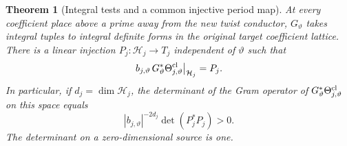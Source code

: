 \documentclass[a4paper,11pt]{article}
\newtheorem{theorem}[proposition]{Theorem}
\theoremstyle{definition}
\theoremstyle{remark}
\numberwithin{equation}{section}
\begin{document}
\begin{theorem}[Integral tests and a common injective period map]
\leavevmode\label{thm:gluedperiodmap844}
At every coefficient place above a prime away from the new twist
conductor, \(G_\vartheta\) takes integral tuples to integral
definite forms in the original target coefficient lattice.
There is a linear injection \(P_j:\mathcal H_j\longrightarrow T_j\)
independent of \(\vartheta\) such that
\[
        b_{j,\vartheta}\,G_\vartheta^*\Theta_{j,\vartheta}^{\rm cl}
                  \big|_{\mathcal H_j}=P_j .
\]
In particular, if \(d_j=\dim\mathcal H_j\), the determinant of the
Gram operator of \(G_\vartheta^*\Theta_{j,\vartheta}^{\rm cl}\) on
this space equals
\[
             |b_{j,\vartheta}|^{-2d_j}\det(P_j^*P_j)>0 .
\]
The determinant on a zero-dimensional source is one.
\end{theorem}
\end{document}
